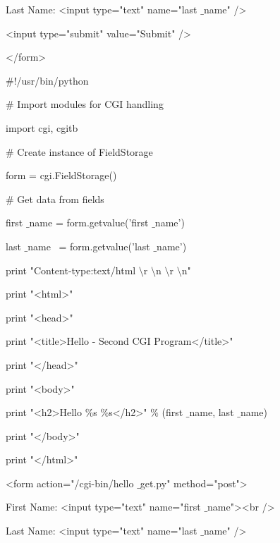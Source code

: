 \begin {enumerate}
\begin {enumerate}
\vspace{12pt}
\noindent
Last Name: <input type="text" name="last $  \_  $name" /> \par
\noindent
<input type="submit" value="Submit" /> \par
\noindent
</form> \par
\vspace{12pt}
\noindent
 $  \#  $!/usr/bin/python \par
\vspace{12pt}
\noindent
 $  \#  $ Import modules for CGI handling  \par
\noindent
import cgi, cgitb  \par
\vspace{12pt}
\noindent
 $  \#  $ Create instance of FieldStorage  \par
\noindent
form = cgi.FieldStorage()  \par
\vspace{12pt}
\noindent
 $  \#  $ Get data from fields \par
\noindent
first $  \_  $name = form.getvalue('first $  \_  $name') \par
\noindent
last $  \_  $name~ = form.getvalue('last $  \_  $name') \par
\vspace{12pt}
\noindent
print "Content-type:text/html $  \setminus  $r $  \setminus  $n $  \setminus  $r $  \setminus  $n" \par
\noindent
print "<html>" \par
\noindent
print "<head>" \par
\noindent
print "<title>Hello - Second CGI Program</title>" \par
\noindent
print "</head>" \par
\noindent
print "<body>" \par
\noindent
print "<h2>Hello  $  \%  $s  $  \%  $s</h2>"  $  \%  $ (first $  \_  $name, last $  \_  $name) \par
\noindent
print "</body>" \par
\noindent
print "</html>" \par
\vspace{12pt}
\noindent
<form action="/cgi-bin/hello $  \_  $get.py" method="post"> \par
\noindent
First Name: <input type="text" name="first $  \_  $name"><br /> \par
\noindent
Last Name: <input type="text" name="last $  \_  $name" /> \par
\vspace{12pt}

\end{enumerate}
\end{enumerate}
